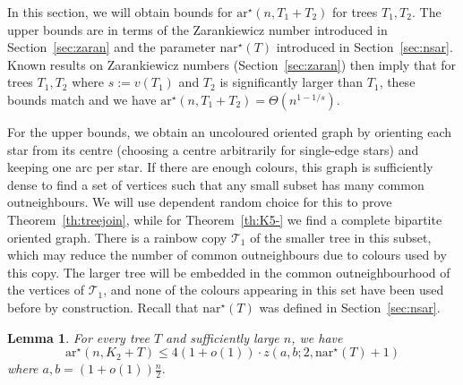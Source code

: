 \documentclass[a4paper, 12pt]{article}
\numberwithin{equation}{section}
\newtheorem{lemma}[theorem]{Lemma}
\def\sar{{\mathrm{ar}^{\star}}}
\def\nsar{{\mathrm{n}\sar}}
\newcommand{\ms}[1]{\mathscr{#1}}
\begin{document}
In this section, we will obtain bounds for $\sar(n,T_1+T_2)$ for trees $T_1,T_2$.
The upper bounds are in terms of the Zarankiewicz number introduced in Section~\ref{sec:zaran} and the parameter $\nsar(T)$ introduced in Section~\ref{sec:nsar}.
Known results on Zarankiewicz numbers (Section~\ref{sec:zaran}) then imply that for trees $T_1,T_2$ where $s := v(T_1)$ and $T_2$ is significantly larger than $T_1$, these bounds match and we have $\sar(n,T_1+T_2) = \Theta(n^{1-1/s})$.

For the upper bounds, we obtain an uncoloured oriented graph by orienting each star from its centre (choosing a centre arbitrarily for single-edge stars) and keeping one arc per star.
If there are enough colours, this graph is sufficiently dense to find a set of vertices such that any small subset has many common outneighbours. We will use dependent random choice for this to prove Theorem~\ref{th:treejoin}, while for Theorem~\ref{th:K5-} we find a complete bipartite oriented graph.
There is a rainbow copy $\ms{T}_1$ of the smaller tree in this subset, which may reduce the number of common outneighbours due to colours used by this copy.
The larger tree will be embedded in the common outneighbourhood of the vertices of $\ms{T}_1$, and none of the colours appearing in this set have been used before by construction.
Recall that $\nsar(T)$ was defined in Section~\ref{sec:nsar}. 

\begin{lemma}\label{lm:K5minus}
    For every tree $T$ and sufficiently large $n$, we have
    $$
    \sar(n,K_2+T) \leq 4(1+o(1))\cdot z(a,b;2,\nsar(T)+1)
    $$
    where $a,b=(1+o(1))\frac{n}{2}$.
\end{lemma}
\end{document}
